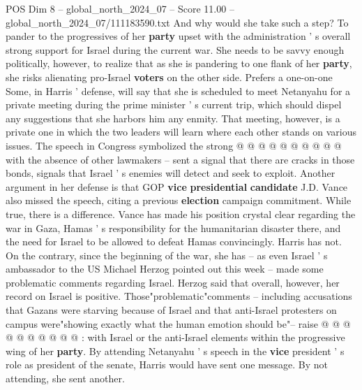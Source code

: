 \begin{textsample}{POS Dim 8 – global\_north\_2024\_07 – Score 11.00 – global\_north\_2024\_07/111183590.txt}
And why would she take such a step?
To pander to the progressives of her \textbf{party} upset with the administration ' s overall strong support for Israel during the current war.
She needs to be savvy enough politically, however, to realize that as she is pandering to one flank of her \textbf{party}, she risks alienating pro-Israel \textbf{voters} on the other side.
Prefers a one-on-one Some, in Harris ' defense, will say that she is scheduled to meet Netanyahu for a private meeting during the prime minister ' s current trip, which should dispel any suggestions that she harbors him any enmity.
That meeting, however, is a private one in which the two leaders will learn where each other stands on various issues.
The speech in Congress symbolized the strong @ @ @ @ @ @ @ @ @ @ with the absence of other lawmakers -- sent a signal that there are cracks in those bonds, signals that Israel ' s enemies will detect and seek to exploit.
Another argument in her defense is that GOP \textbf{vice} \textbf{presidential} \textbf{candidate} J.D.
Vance also missed the speech, citing a previous \textbf{election} campaign commitment.
While true, there is a difference.
Vance has made his position crystal clear regarding the war in Gaza, Hamas ' s responsibility for the humanitarian disaster there, and the need for Israel to be allowed to defeat Hamas convincingly.
Harris has not.
On the contrary, since the beginning of the war, she has -- as even Israel ' s ambassador to the US Michael Herzog pointed out this week -- made some problematic comments regarding Israel.
Herzog said that overall, however, her record on Israel is positive.
Those"problematic"comments -- including accusations that Gazans were starving because of Israel and that anti-Israel protesters on campus were"showing exactly what the human emotion should be"-- raise @ @ @ @ @ @ @ @ @ @ : with Israel or the anti-Israel elements within the progressive wing of her \textbf{party}.
By attending Netanyahu ' s speech in the \textbf{vice} president ' s role as president of the senate, Harris would have sent one message.
By not attending, she sent another.

\end{textsample}
